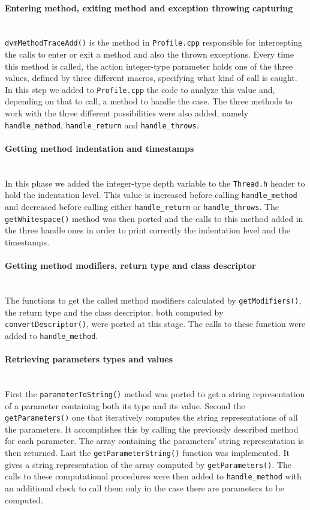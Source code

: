 \paragraph{Entering method, exiting method and exception throwing capturing} ~\\
\texttt{dvmMethodTraceAdd()} is the method in \texttt{Profile.cpp}
responsible for intercepting the calls to enter or exit a method and
also the thrown exceptions. Every time this method is called, the
action integer-type parameter holds one of the three values, defined
by three different macros, specifying what kind of call is caught. In
this step we added to \texttt{Profile.cpp} the code to analyze this
value and, depending on that to call, a method to handle the case. The
three methods to work with the three different possibilities were also
added, namely \texttt{handle\_method}, \texttt{handle\_return} and
\texttt{handle\_throws}.

\paragraph{Getting method indentation and timestamps} ~\\
In this phase we added the integer-type depth variable to the
\texttt{Thread.h} header to hold the indentation level. This value is
increased before calling \texttt{handle\_method} and decreased before
calling either \texttt{handle\_return} or \texttt{handle\_throws}. The
\texttt{getWhitespace()} method was then ported and the calls to this
method added in the three handle ones in order to print correctly the
indentation level and the timestamps.

\paragraph{Getting method modifiers, return type and class descriptor} ~\\
The functions to get the called method modifiers calculated by
\texttt{getModifiers()}, the return type and the class descriptor,
both computed by \texttt{convertDescriptor()}, were ported at this
stage. The calls to these function were added to
\texttt{handle\_method}.

\paragraph{Retrieving parameters types and values} ~\\
First the \texttt{parameterToString()} method was ported to get a
string representation of a parameter containing both its type and its
value. Second the \texttt{getParameters()} one that iteratively
computes the string representations of all the parameters. It
accomplishes this by calling the previously described method for each
parameter. The array containing the parameters' string representation
is then returned. Last the \texttt{getParameterString()} function was
implemented. It gives a string representation of the array computed by
\texttt{getParameters()}. The calls to these computational procedures
were then added to \texttt{handle\_method} with an additional check to
call them only in the case there are parameters to be computed.


